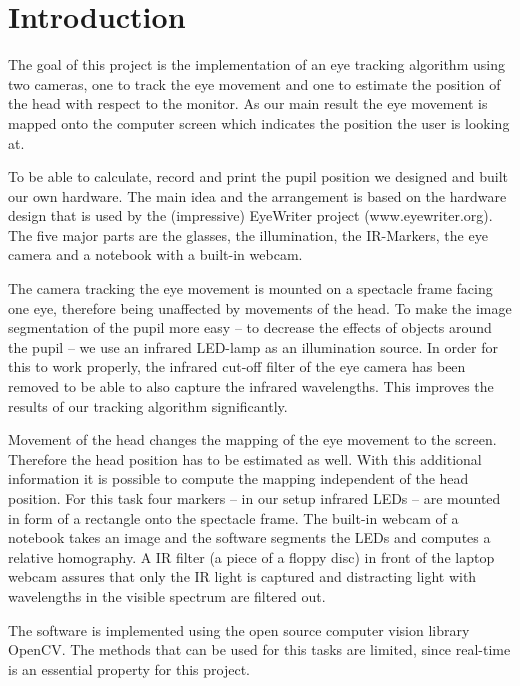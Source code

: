 \section{Introduction}\label{introduction}

The goal of this project is the implementation of an eye tracking algorithm using two cameras, one to track the eye movement and one to estimate the position of the head with respect to the monitor. As our main result the eye movement is mapped onto the computer screen which indicates the position the user is looking at. 

To be able to calculate, record and print the pupil position we designed and built our own hardware. The main idea and the arrangement is based on the hardware design that is used by the (impressive) EyeWriter project (www.eyewriter.org). 
The five major parts are the glasses, the illumination, the IR-Markers, the eye camera and a notebook with a built-in webcam.

The camera tracking the eye movement is mounted on a spectacle frame facing one eye, therefore being unaffected by movements of the head. 
To make the image segmentation of the pupil more easy -- to decrease the effects of objects around the pupil  -- we use an infrared LED-lamp as an illumination source. In order for this to work properly, the infrared cut-off filter of the eye camera has been removed to be able to also capture the infrared wavelengths. This improves the results of our tracking algorithm significantly.

Movement of the head changes the mapping of the eye movement to the screen. Therefore the head position has to be estimated as well.
With this additional information it is possible to compute the mapping independent of the head position. 
For this task four markers -- in our setup infrared LEDs -- are mounted in form of a rectangle onto the spectacle frame. 
The built-in webcam of a notebook takes an image and the software segments the LEDs and computes a relative homography. 
A IR filter (a piece of a floppy disc) in front of the laptop webcam assures that only the IR light is captured and distracting light with wavelengths in the visible spectrum are filtered out.

The software is implemented using the open source computer vision library OpenCV. The methods that can be used for this tasks are limited, since real-time is an essential property for this project.

